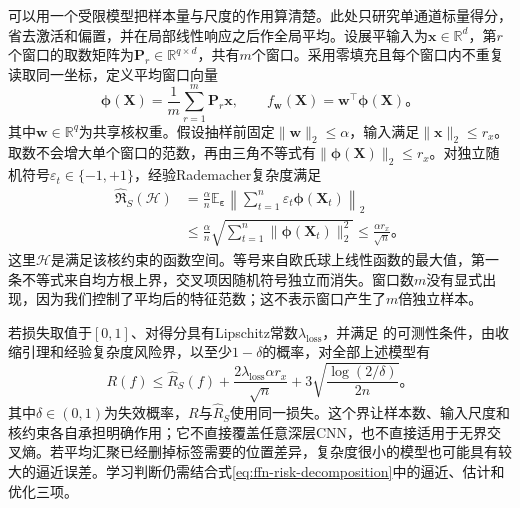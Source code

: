 可以用一个受限模型把样本量与尺度的作用算清楚。此处只研究单通道标量得分，省去激活和偏置，并在局部线性响应之后作全局平均。设展平输入为$\bm x\in\mathbb R^d$，第$r$个窗口的取数矩阵为$\bm P_r\in\mathbb R^{q\times d}$，共有$m$个窗口。采用零填充且每个窗口内不重复读取同一坐标，定义平均窗口向量
\begin{equation}
  \bm\phi(\bm X)=\frac1m\sum_{r=1}^{m}\bm P_r\bm x,
  \qquad f_{\bm w}(\bm X)=\bm w^\top\bm\phi(\bm X)\text{。}
  \label{eq:cnn-pooled-linear-model}
\end{equation}
其中$\bm w\in\mathbb R^q$为共享核权重。假设抽样前固定$\lVert\bm w\rVert_2\leq\alpha$，输入满足$\lVert\bm x\rVert_2\leq r_x$。取数不会增大单个窗口的范数，再由三角不等式有$\lVert\bm\phi(\bm X)\rVert_2\leq r_x$。对独立随机符号$\varepsilon_t\in\{-1,+1\}$，经验Rademacher复杂度满足
\begin{equation}
  \begin{aligned}
    \widehat{\mathfrak R}_S(\mathcal H)
    &=\frac\alpha n\mathbb E_{\bm\varepsilon}
           \left\lVert\sum_{t=1}^{n}\varepsilon_t\bm\phi(\bm X_t)\right\rVert_2\\
    &\leq\frac\alpha n
         \sqrt{\sum_{t=1}^{n}\lVert\bm\phi(\bm X_t)\rVert_2^2}
     \leq\frac{\alpha r_x}{\sqrt n}\text{。}
  \end{aligned}
  \label{eq:cnn-pooled-rademacher}
\end{equation}
这里$\mathcal H$是满足该核约束的函数空间。等号来自欧氏球上线性函数的最大值，第一条不等式来自均方根上界，交叉项因随机符号独立而消失。窗口数$m$没有显式出现，因为我们控制了平均后的特征范数；这不表示窗口产生了$m$倍独立样本。

若损失取值于$[0,1]$、对得分具有Lipschitz常数$\lambda_{\mathrm{loss}}$，并满足
的可测性条件，由收缩引理和经验复杂度风险界，以至少$1-\delta$的概率，对全部上述模型有
\begin{equation}
  R(f)\leq\widehat R_S(f)
    +\frac{2\lambda_{\mathrm{loss}}\alpha r_x}{\sqrt n}
    +3\sqrt{\frac{\log(2/\delta)}{2n}}\text{。}
  \label{eq:cnn-pooled-risk-bound}
\end{equation}
其中$\delta\in(0,1)$为失效概率，$R$与$\widehat R_S$使用同一损失。这个界让样本数、输入尺度和核约束各自承担明确作用；它不直接覆盖任意深层CNN，也不直接适用于无界交叉熵。若平均汇聚已经删掉标签需要的位置差异，复杂度很小的模型也可能具有较大的逼近误差。学习判断仍需结合式\eqref{eq:ffn-risk-decomposition}中的逼近、估计和优化三项。

